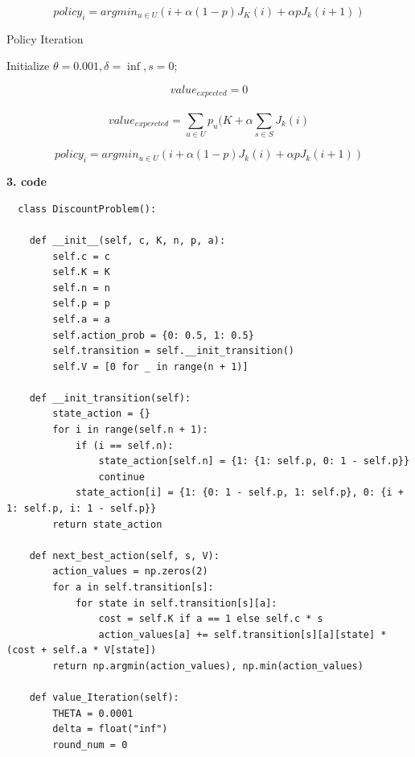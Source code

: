 \documentclass{assignment}
\begin{document}
\begin{problemlist}
\begin{problem}
\begin{answer}
\begin{algorithm}[h]
{{      }
	}
    {$$policy_{i} = argmin_{u\in U} (i+\alpha(1-p) J_K (i)+\alpha p J_k (i+1))$$}

\end{algorithm}

\begin{algorithm}[h]
  \caption{Policy Iteration}
	\BlankLine
	Initialize $\theta=0.001, \delta=\inf, s=0$;
	
	\While{\textnormal{$\delta>\theta$}}
  {
    {
      $$value_{expected}=0$$ \\
    
      $$value_{expercted}=\sum_{u\in U}p_u (K +\alpha \sum_{s\in S}J_k (i)$$

      }
	}

    {
      $$policy_{i}= argmin_{u∈U} (i+\alpha(1-p) J_k (i)+\alpha pJ_k (i+1))$$}
\end{algorithm}

\begin{flushleft}
  \large\textbf{3. code}
\end{flushleft}
\begin{lstlisting}
  class DiscountProblem():

    def __init__(self, c, K, n, p, a):
        self.c = c
        self.K = K
        self.n = n
        self.p = p
        self.a = a
        self.action_prob = {0: 0.5, 1: 0.5}
        self.transition = self.__init_transition()
        self.V = [0 for _ in range(n + 1)]

    def __init_transition(self):
        state_action = {}
        for i in range(self.n + 1):
            if (i == self.n):
                state_action[self.n] = {1: {1: self.p, 0: 1 - self.p}}
                continue
            state_action[i] = {1: {0: 1 - self.p, 1: self.p}, 0: {i + 1: self.p, i: 1 - self.p}}
        return state_action

    def next_best_action(self, s, V):
        action_values = np.zeros(2)
        for a in self.transition[s]:
            for state in self.transition[s][a]:
                cost = self.K if a == 1 else self.c * s
                action_values[a] += self.transition[s][a][state] * (cost + self.a * V[state])
        return np.argmin(action_values), np.min(action_values)

    def value_Iteration(self):
        THETA = 0.0001
        delta = float("inf")
        round_num = 0


\end{lstlisting}
\end{answer}
\end{problem}
\end{problemlist}
\end{document}
